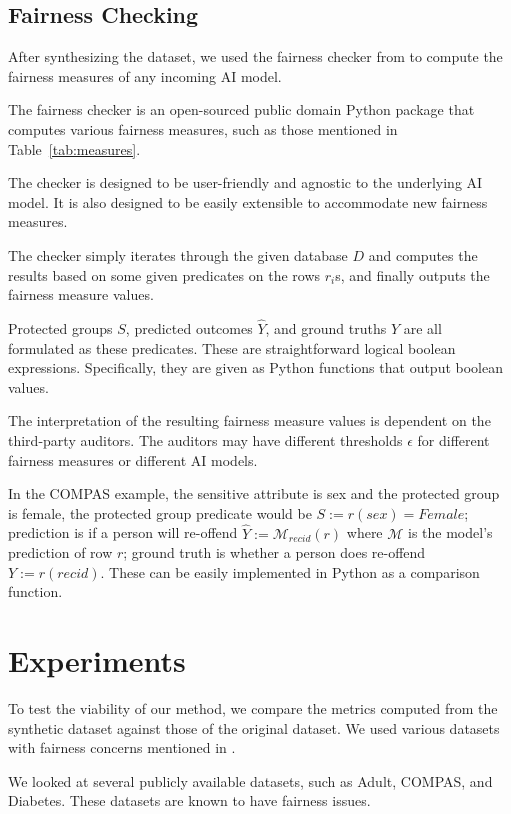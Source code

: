 \documentclass[manuscript,screen,review,anonymous]{acmart}
\newcommand{\db}{D}
\begin{document}
\subsection{Fairness Checking}

After synthesizing the dataset, we used the fairness checker from \cite{yuan2024ensuring} to compute the fairness measures of any incoming AI model.

The fairness checker is an open-sourced public domain Python package that computes various fairness measures, such as those mentioned in Table~\ref{tab:measures}.

The checker is designed to be user-friendly and agnostic to the underlying AI model. It is also designed to be easily extensible to accommodate new fairness measures.

The checker simply iterates through the given database $\db$ and computes the results based on some given predicates on the rows $r_i$s, and finally outputs the fairness measure values.

Protected groups $S$, predicted outcomes $\hat{Y}$, and ground truths $Y$ are all formulated as these predicates. These are straightforward logical boolean expressions. Specifically, they are given as Python functions that output boolean values.

The interpretation of the resulting fairness measure values is dependent on the third-party auditors. The auditors may have different thresholds $\epsilon$ for different fairness measures or different AI models.

In the COMPAS example, the sensitive attribute is sex and the protected group is female, the protected group predicate would be $S := r(sex) = Female$; prediction is if a person will re-offend $\hat{Y} := \mathcal{M}_{recid}(r)$ where $\mathcal{M}$ is the model's prediction of row $r$; ground truth is whether a person does re-offend $Y := r(recid)$. These can be easily implemented in Python as a comparison function.

\section{Experiments}

To test the viability of our method, we compare the metrics computed from the synthetic dataset against those of the original dataset. We used various datasets with fairness concerns mentioned in \cite{pessach2022review}.

We looked at several publicly available datasets, such as Adult\cite{adult_2,Kaggle_Adult_Census_Income}, COMPAS\cite{larson2016propublica,Kaggle_COMPAS_Dataset}, and Diabetes\cite{diabetes_34,Kaggle_Diabetes_Prediction}. These datasets are known to have fairness issues\cite{pessach2022review}.
\end{document}
